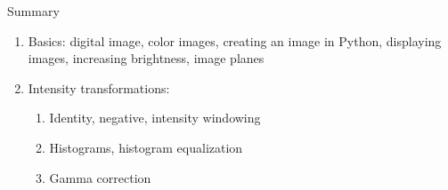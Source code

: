 \begin{frame}{Summary}
    \begin{enumerate}
      \item Basics: digital image, color images, creating an image in Python, displaying images, increasing brightness, image planes
      \item Intensity transformations:
        \begin{enumerate}
          \item Identity, negative, intensity windowing
          \item Histograms, histogram equalization
          \item Gamma correction
        \end{enumerate}
    \end{enumerate}
\end{frame}
